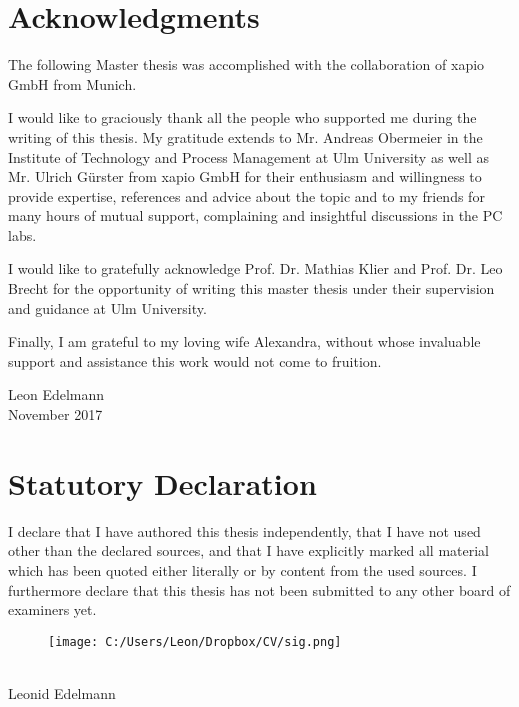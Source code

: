 \section*{Acknowledgments}

The following Master thesis was accomplished with the collaboration of xapio GmbH from Munich. 

\hspace{0.7cm}

I would like to graciously thank all the people who supported me during the writing of this thesis. My gratitude extends to Mr. Andreas Obermeier in the Institute of Technology and Process Management at Ulm University as well as Mr. Ulrich G\"urster from xapio GmbH for their enthusiasm and willingness to provide expertise, references and advice about the topic and to my friends for many hours of mutual support, complaining and insightful discussions in the PC labs.

\hspace{0.7cm}

I would like to gratefully acknowledge Prof. Dr. Mathias Klier and Prof. Dr. Leo Brecht for the opportunity of writing this master thesis under their supervision and guidance at Ulm University.

\hspace{0.7cm}

Finally, I am grateful to my loving wife Alexandra, without whose invaluable support and assistance this work would not come to fruition.

\hspace{0.7cm}

\begin{flushright}
	Leon Edelmann\\
	November 2017
\end{flushright}

\newpage

\section*{Statutory Declaration}

I declare that I have authored this thesis independently, that I have not used other than the declared sources, and that I have explicitly marked all material which has been quoted either literally or by content from the used sources. I furthermore declare that this thesis has not been submitted to any other board of examiners yet.


\vspace{2cm}
\begin{figure}[H]
	\texttt{[image: C:/Users/Leon/Dropbox/CV/sig.png]}
\end{figure}
\vspace{-1.3cm}
\underline{\hspace{3cm}} \\
Leonid Edelmann

\newpage